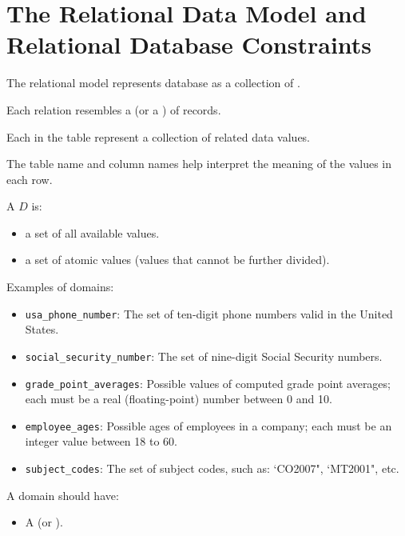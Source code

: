 \chapter{The Relational Data Model and Relational Database Constraints}

  \par The relational model represents database as a collection of .
  \par Each relation resembles a  (or a ) of records.
  \par Each  in the table represent a collection of related data values.
  \par The table name and column names help interpret the meaning of the values in each row.


      \par A  $D$ is:

        \begin{itemize}
          \item a set of all available values.
          \item a set of atomic values (values that cannot be further divided).
        \end{itemize}

      \par Examples of domains:

        \begin{itemize}
          \item \lstinline{usa_phone_number}: The set of ten-digit phone numbers valid in the United States.
          \item \lstinline{social_security_number}: The set of nine-digit Social Security numbers.
          \item \lstinline{grade_point_averages}: Possible values of computed grade point averages; each must be a real (floating-point) number between 0 and 10.
          \item \lstinline{employee_ages}: Possible ages of employees in a company; each must be an integer value between 18 to 60.
          \item \lstinline{subject_codes}: The set of subject codes, such as: `CO2007", `MT2001", etc.
        \end{itemize}

      \par A domain should have:
      \begin{itemize}
        \item A  (or ).
      \end{itemize}

